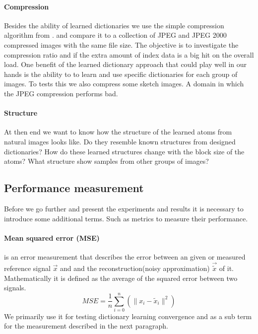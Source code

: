 \paragraph{Compression}
Besides the ability of learned dictionaries 
we use the simple compression algorithm from  .
and compare it to a collection of JPEG and JPEG 2000 compressed images with the
same file size. The objective is to investigate the compression ratio and if the
extra amount of index data is a big hit on the overall load.
One benefit of the learned dictionary approach that could play well in our
hands is the ability to to learn and use specific dictionaries for each group of
images. To tests this we also compress some sketch images. A domain in which
the JPEG compression performs bad.

\paragraph{Structure}
At then end we want to know how the structure of the learned atoms from natural
images looks like. Do they resemble known structures from designed dictionaries?
How do these learned structures change with the block size of the atoms?
What structure show samples from other groups of images?

\subsection{Performance measurement}
Before we go further and present the experiments and results it is necessary to
introduce some additional terms. Such as metrics to measure their performance.

\paragraph{Mean squared error (MSE)} is an error measurement that
describes the error between an given or measured reference signal $\vec{x}$
and and the reconstruction(noisy approximation) $\vec{\tilde{x}}$ of it.
Mathematically it is defined as the average of the squared error between two
signals.
\begin{equation*}
 MSE = \frac{1}{n} \sum_{i=0}^{n} \left( {\lVert x_i -
\tilde{x}_i\rVert^{2}}\right)
\end{equation*}
We primarily use it for testing dictionary learning convergence and as a
sub term for the measurement described in the next paragraph.

